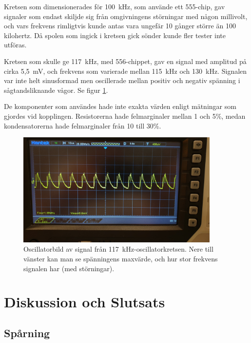 \documentclass[a4paper]{article}
\begin{document}
\begin{sloppypar}
    Kretsen som dimensionerades för 100~kHz, som använde ett 555-chip, gav signaler som endast skiljde sig från omgivningens störningar med någon millivolt, och vars frekvens rimligtvis kunde antas vara ungefär 10 gånger större än 100 kilohertz.
    Då spolen som ingick i kretsen gick sönder kunde fler tester inte utföras.

    Kretsen som skulle ge 117~kHz, med 556-chippet, gav en signal med amplitud på cirka 5,5~mV, och frekvens som varierade mellan 115~kHz och 130~kHz.
    Signalen var inte helt sinusformad men oscillerade mellan positiv och negativ spänning i sågtandsliknande vågor. Se figur \ref{fig:signal-117kHz}.

    De komponenter som användes hade inte exakta värden enligt mätningar som gjordes vid kopplingen. Resistorerna hade felmarginaler mellan 1 och 5\%, medan kondensatorerna hade felmarginaler från 10 till 30\%.

    \begin{figure}[H]
        \centering
        \includegraphics[width = 0.9\textwidth]{signal-555-117kHz.jpg}
        \caption{Oscillatorbild av signal från 117~kHz-oscillatorkretsen. Nere till vänster kan man se spänningens maxvärde, och hur stor frekvens signalen har (med störningar).}
        \label{fig:signal-117kHz}
    \end{figure}

    \section{Diskussion och Slutsats}
    \subsection{Spårning}

\end{sloppypar}
\end{document}
